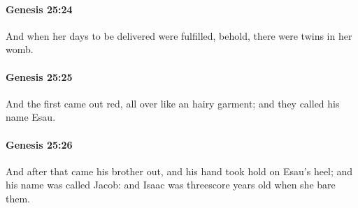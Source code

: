 		\paragraph{Genesis 25:24} %
			\label{GENESIS-25-24}

			And when her days to be delivered were fulfilled, behold, there were twins in her womb.


		\paragraph{Genesis 25:25} %
			\label{GENESIS-25-25}

			And the first came out red, all over like an hairy garment; and they called his name Esau.


		\paragraph{Genesis 25:26} %
			\label{GENESIS-25-26}

			And after that came his brother out, and his hand took hold on Esau's heel; and his name was called Jacob: and Isaac was threescore years old when she bare them.


